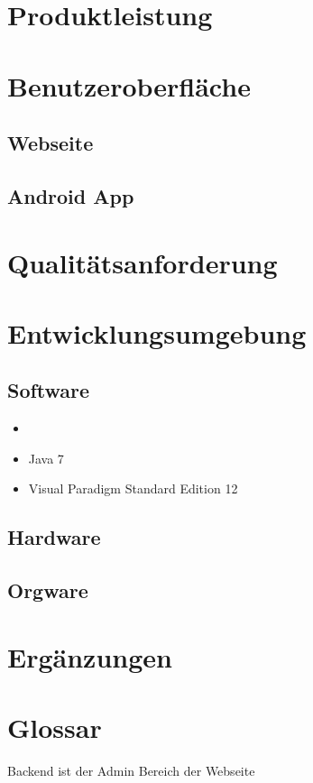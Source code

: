 \documentclass[10pt,a4paper]{article}
\begin{document}
\section{Produktleistung}

\section{Benutzeroberfl\"ache}
\subsection{Webseite}
\subsection{Android App}
\section{Qualit\"atsanforderung}

\section{Entwicklungsumgebung}
\subsection{Software}
\begin{itemize}
	\item 
	\item Java 7
	\item Visual Paradigm Standard Edition 12
\end{itemize}
\subsection{Hardware}
\subsection{Orgware}
\section{Erg\"anzungen}

\section{Glossar}

Backend ist der Admin Bereich der Webseite
\end{document}
